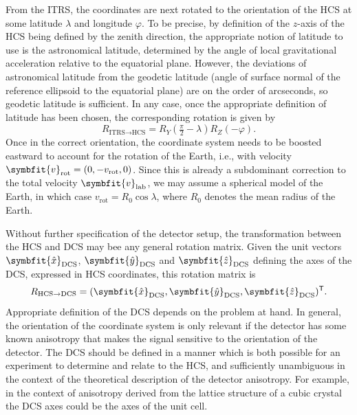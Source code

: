 \documentclass[b5paper, 10pt, twoside]{book}
\renewcommand{\vec}[1]{\symbfit{#1}}
\newcommand{\unitv}[1]{\symbfit{\hat{#1}}}
\newcommand{\transp}{\mathsf{T}}
\begin{document}
From the ITRS, the coordinates are next rotated to the orientation of the HCS at some latitude $\lambda$ and longitude $\varphi$. To be precise, by definition of the $z$-axis of the HCS being defined by the zenith direction, the appropriate notion of latitude to use is the astronomical latitude, determined by the angle of local gravitational acceleration relative to the equatorial plane. However, the deviations of astronomical latitude from the geodetic latitude (angle of surface normal of the reference ellipsoid to the equatorial plane) are on the order of arcseconds, so geodetic latitude is sufficient. In any case, once the appropriate definition of latitude has been chosen, the corresponding rotation is given by
\begin{equation}
    R_{\text{ITRS}\rightarrow\text{HCS}}=R_Y(\tfrac{\pi}{2}-\lambda)R_Z(-\varphi).
\end{equation}
Once in the correct orientation, the coordinate system needs to be boosted eastward to account for the rotation of the Earth, i.e., with velocity $\vec{v}_\text{rot}=(0,-v_\text{rot},0)$. Since this is already a subdominant correction to the total velocity $\vec{v}_\text{lab}$, we may assume a spherical model of the Earth, in which case $v_\text{rot}=R_0\cos\lambda$, where $R_0$ denotes the mean radius of the Earth.

Without further specification of the detector setup, the transformation between the HCS and DCS may bee any general rotation matrix. Given the unit vectors $\unitv{x}_\text{DCS}$, $\unitv{y}_\text{DCS}$ and $\unitv{z}_\text{DCS}$ defining the axes of the DCS, expressed in HCS coordinates, this rotation matrix is
\begin{equation}
    R_{\text{HCS}\rightarrow\text{DCS}}=
    (
        \unitv{x}_\text{DCS},
        \unitv{y}_\text{DCS},
        \unitv{z}_\text{DCS}
    )^\transp.
\end{equation}
Appropriate definition of the DCS depends on the problem at hand. In general, the orientation of the coordinate system is only relevant if the detector has some known anisotropy that makes the signal sensitive to the orientation of the detector. The DCS should be defined in a manner which is both possible for an experiment to determine and relate to the HCS, and sufficiently unambiguous in the context of the theoretical description of the detector anisotropy. For example, in the context of anisotropy derived from the lattice structure of a cubic crystal the DCS axes could be the axes of the unit cell.
\end{document}
